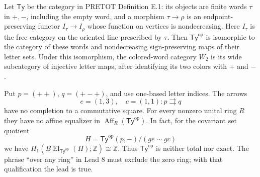 \begin{proposition}\label{FT:ty}
Let $\mathsf{Ty}$ be the category in PRETOT Definition E.1: its objects
are finite words $\tau$ in $+,-$, including the empty word, and a morphism
$\tau\to\rho$ is an endpoint-preserving functor
$I_\tau\to I_\rho$ whose function on vertices is nondecreasing. Here
$I_\tau$ is the free category on the oriented line prescribed by $\tau$.
Then $\mathsf{Ty}^{\mathrm{op}}$ is isomorphic to the category of these
words and nondecreasing sign-preserving maps of their letter sets.
Under this isomorphism, the colored-word category $W_2$ is its wide
subcategory of injective letter maps, after identifying its two colors
with $+$ and $-$.

Put $p=(++)$, $q=(+-+)$, and use one-based letter indices. The arrows
\[
 e=(1,3),\quad c=(1,1):p\rightrightarrows q
\]
have no completion to a commutative square. For every nonzero unital
ring $R$ they have no affine equalizer in
$\operatorname{Aff}_R(\mathsf{Ty}^{\mathrm{op}})$.
In fact, for the covariant set quotient
\[
 H=\mathsf{Ty}^{\mathrm{op}}(p,-)/(ge\sim gc)
\]
we have
$H_1(B\operatorname{El}_{\mathsf{Ty}^{\mathrm{op}}}(H);\mathbb Z)
\cong\mathbb Z$. Thus $\mathsf{Ty}^{\mathrm{op}}$ is neither total nor
exact. The phrase ``over any ring'' in Lead 8 must exclude the zero ring;
with that qualification the lead is true.
\end{proposition}

